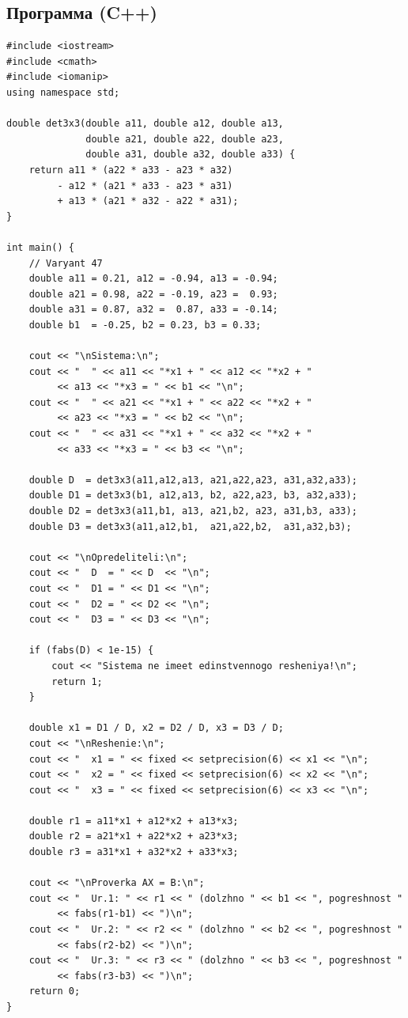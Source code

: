 \documentclass[a4paper,12pt]{article}
\begin{document}
\subsection{Программа (C++)}

\begin{lstlisting}[style=cppstyle, caption={Лаб. №2 --- метод Крамера, вариант 47}]
#include <iostream>
#include <cmath>
#include <iomanip>
using namespace std;

double det3x3(double a11, double a12, double a13,
              double a21, double a22, double a23,
              double a31, double a32, double a33) {
    return a11 * (a22 * a33 - a23 * a32)
         - a12 * (a21 * a33 - a23 * a31)
         + a13 * (a21 * a32 - a22 * a31);
}

int main() {
    // Varyant 47
    double a11 = 0.21, a12 = -0.94, a13 = -0.94;
    double a21 = 0.98, a22 = -0.19, a23 =  0.93;
    double a31 = 0.87, a32 =  0.87, a33 = -0.14;
    double b1  = -0.25, b2 = 0.23, b3 = 0.33;

    cout << "\nSistema:\n";
    cout << "  " << a11 << "*x1 + " << a12 << "*x2 + "
         << a13 << "*x3 = " << b1 << "\n";
    cout << "  " << a21 << "*x1 + " << a22 << "*x2 + "
         << a23 << "*x3 = " << b2 << "\n";
    cout << "  " << a31 << "*x1 + " << a32 << "*x2 + "
         << a33 << "*x3 = " << b3 << "\n";

    double D  = det3x3(a11,a12,a13, a21,a22,a23, a31,a32,a33);
    double D1 = det3x3(b1, a12,a13, b2, a22,a23, b3, a32,a33);
    double D2 = det3x3(a11,b1, a13, a21,b2, a23, a31,b3, a33);
    double D3 = det3x3(a11,a12,b1,  a21,a22,b2,  a31,a32,b3);

    cout << "\nOpredeliteli:\n";
    cout << "  D  = " << D  << "\n";
    cout << "  D1 = " << D1 << "\n";
    cout << "  D2 = " << D2 << "\n";
    cout << "  D3 = " << D3 << "\n";

    if (fabs(D) < 1e-15) {
        cout << "Sistema ne imeet edinstvennogo resheniya!\n";
        return 1;
    }

    double x1 = D1 / D, x2 = D2 / D, x3 = D3 / D;
    cout << "\nReshenie:\n";
    cout << "  x1 = " << fixed << setprecision(6) << x1 << "\n";
    cout << "  x2 = " << fixed << setprecision(6) << x2 << "\n";
    cout << "  x3 = " << fixed << setprecision(6) << x3 << "\n";

    double r1 = a11*x1 + a12*x2 + a13*x3;
    double r2 = a21*x1 + a22*x2 + a23*x3;
    double r3 = a31*x1 + a32*x2 + a33*x3;

    cout << "\nProverka AX = B:\n";
    cout << "  Ur.1: " << r1 << " (dolzhno " << b1 << ", pogreshnost "
         << fabs(r1-b1) << ")\n";
    cout << "  Ur.2: " << r2 << " (dolzhno " << b2 << ", pogreshnost "
         << fabs(r2-b2) << ")\n";
    cout << "  Ur.3: " << r3 << " (dolzhno " << b3 << ", pogreshnost "
         << fabs(r3-b3) << ")\n";
    return 0;
}
\end{lstlisting}
\end{document}
